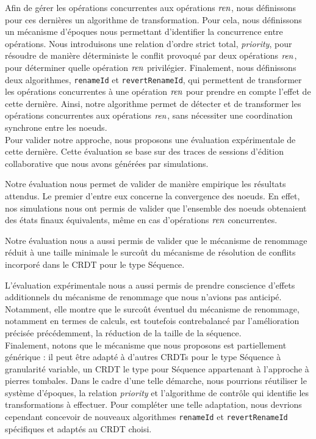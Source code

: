 Afin de gérer les opérations concurrentes aux opérations $\mathit{ren}$, nous définissons pour ces dernières un algorithme de transformation.
Pour cela, nous définissons un mécanisme d'époques nous permettant d'identifier la concurrence entre opérations.
Nous introduisons une relation d'ordre strict total, \emph{priority}, pour résoudre de manière déterministe le conflit provoqué par deux opérations $\mathit{ren}$, \ie pour déterminer quelle opération $\mathit{ren}$ privilégier.
Finalement, nous définissons deux algorithmes, \texttt{renameId} et \texttt{revertRenameId}, qui permettent de transformer les opérations concurrentes à une opération $\mathit{ren}$ pour prendre en compte l'effet de cette dernière.
Ainsi, notre algorithme permet de détecter et de transformer les opérations concurrentes aux opérations $\mathit{ren}$, sans nécessiter une coordination synchrone entre les noeuds.\\


Pour valider notre approche, nous proposons une évaluation expérimentale de cette dernière.
Cette évaluation se base sur des traces de sessions d'édition collaborative que nous avons générées par simulations.

Notre évaluation nous permet de valider de manière empirique les résultats attendus.
Le premier d'entre eux concerne la convergence des noeuds.
En effet, nos simulations nous ont permis de valider que l'ensemble des noeuds obtenaient des états finaux équivalents, même en cas d'opérations $\mathit{ren}$ concurrentes.

Notre évaluation nous a aussi permis de valider que le mécanisme de renommage réduit à une taille minimale le surcoût du mécanisme de résolution de conflits incorporé dans le \ac{CRDT} pour le type Séquence.

L'évaluation expérimentale nous a aussi permis de prendre conscience d'effets additionnels du mécanisme de renommage que nous n'avions pas anticipé.
Notamment, elle montre que le surcoût éventuel du mécanisme de renommage, notamment en termes de calculs, est toutefois contrebalancé par l'amélioration précisée précédemment, \ie la réduction de la taille de la séquence.\\

Finalement, notons que le mécanisme que nous proposons est partiellement générique : il peut être adapté à d'autres \acp{CRDT} pour le type Séquence à granularité variable, \eg un \ac{CRDT} le type pour Séquence appartenant à l'approche à pierres tombales.
Dans le cadre d'une telle démarche, nous pourrions réutiliser le système d'époques, la relation \emph{priority} et l'algorithme de contrôle qui identifie les transformations à effectuer.
Pour compléter une telle adaptation, nous devrions cependant concevoir de nouveaux algorithmes \texttt{renameId} et \texttt{revertRenameId} spécifiques et adaptés au \ac{CRDT} choisi.\\

